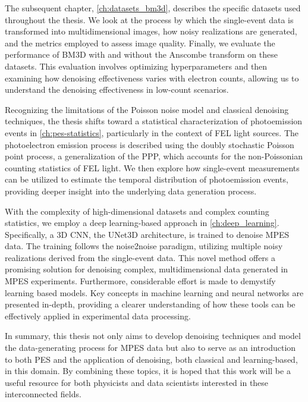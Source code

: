 The subsequent chapter, \cref{ch:datasets_bm3d}, describes the specific datasets used throughout the thesis. We look at the  process by which the single-event data is transformed into multidimensional images, how noisy realizations are generated, and the metrics employed to assess image quality. Finally, we evaluate the performance of \gls{BM3D} with and without the Anscombe transform on these datasets. This evaluation involves optimizing hyperparameters and then examining how denoising effectiveness varies with electron counts, allowing us to understand the denoising effectiveness in low-count scenarios.

Recognizing the limitations of the Poisson noise model and classical denoising techniques, the thesis shifts toward a statistical characterization of photoemission events in \cref{ch:pes-statistics}, particularly in the context of \gls{FEL} light sources. The photoelectron emission process is described using the doubly stochastic Poisson point process, a generalization of the \gls{PPP}, which accounts for the non-Poissonian counting statistics of \gls{FEL} light. We then explore how single-event measurements can be utilized to estimate the temporal distribution of photoemission events, providing deeper insight into the underlying data generation process.

With the complexity of high-dimensional datasets and complex counting statistics, we employ a deep learning-based approach in \cref{ch:deep_learning}. Specifically, a 3D \gls{CNN}, the UNet3D architecture, is trained to denoise \gls{MPES} data. The training follows the \gls{noise2noise} paradigm, utilizing multiple noisy realizations derived from the single-event data. This novel method offers a promising solution for denoising complex, multidimensional data generated in \gls{MPES} experiments. Furthermore, considerable effort is made to demystify learning based models. Key concepts in machine learning and neural networks are presented in-depth, providing a clearer understanding of how these tools can be effectively applied in experimental data processing.

In summary, this thesis not only aims to develop denoising techniques and model the data-generating process for \gls{MPES} data but also to serve as an introduction to both \gls{PES} and the application of denoising, both classical and learning-based, in this domain. By combining these topics, it is hoped that this work will be a useful resource for both physicists and data scientists interested in these interconnected fields.